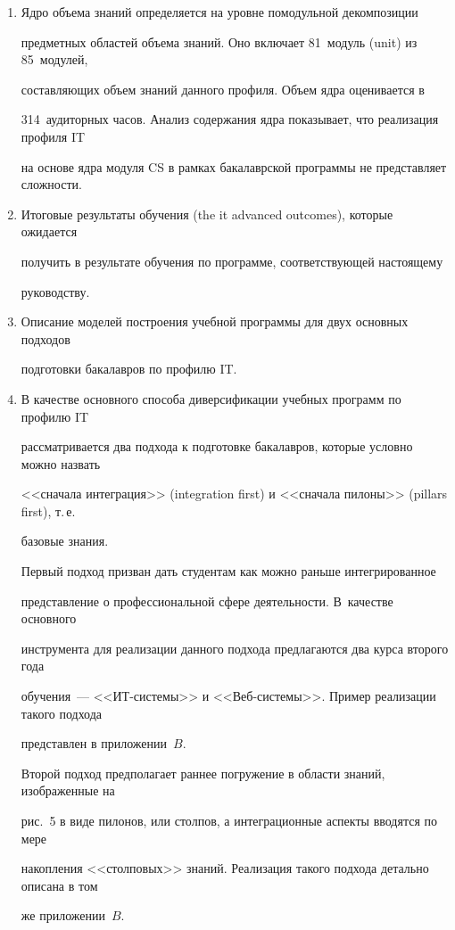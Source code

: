 \begin{enumerate}[1.]
знаний, которые используются при подробном описании объема знаний, представленного 

в приложении~$A$. Для большинства модулей определяются обязательные цели обучения 

(core outcomes), т.\,е.\ связанные с изучением обязательных элементов объема знаний. 

\item Ядро объема знаний определяется на уровне помодульной декомпозиции 

предметных областей объема знаний. Оно включает 81~модуль (unit) из 85~модулей, 

составляющих объем знаний данного профиля. Объем ядра оценивается в 

314~аудиторных часов. Анализ содержания ядра показывает, что реализация профиля IT 

на основе ядра модуля CS в рамках бакалаврской программы не представляет сложности.

\item Итоговые результаты обучения (the it advanced outcomes), которые ожидается 

получить в результате обучения по программе, соответствующей настоящему 

руководству.

\item Описание моделей построения учебной программы для двух основных подходов 

подготовки бакалавров по профилю IT.

\item В качестве основного способа диверсификации учебных программ по профилю IT 

рассматривается два подхода к подготовке бакалавров, которые условно можно назвать 

<<сначала интеграция>> (integration first) и <<сначала пилоны>> (pillars first), т.\,е.\ 

базовые знания. 



Первый подход призван дать студентам как можно раньше интегрированное 

представление о профессиональной сфере деятельности. В~качестве основного 

инструмента для реализации данного подхода предлагаются два курса второго года 

обучения~--- <<ИТ-системы>> и <<Веб-системы>>. Пример реализации такого подхода 

представлен в приложении~$B$.



Второй подход предполагает раннее погружение в области знаний, изображенные на 

рис.~5 в виде пилонов, или столпов, а интеграционные аспекты вводятся по мере 

накопления <<столповых>> знаний. Реализация такого подхода детально описана в том 

же приложении~$B$.

\end{enumerate}



